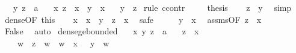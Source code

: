 \begin{isabellebody}
\ \ \ y\ z\ {\isacharcolon}{\kern0pt}{\isacharcolon}{\kern0pt}\ {\isacharprime}{\kern0pt}a\isanewline
\ \ \ {\isachardoublequoteopen}{\isasymAnd}x{\isachardot}{\kern0pt}\ z\ {\isacharless}{\kern0pt}\ x\ {\isasymLongrightarrow}\ y\ {\isasymle}\ x{\isachardoublequoteclose}\isanewline
\ \ \ {\isachardoublequoteopen}y\ {\isasymle}\ z{\isachardoublequoteclose}\isanewline
%
\isadelimproof
%
\endisadelimproof
%
\isatagproof
{}\isamarkupfalse%
\ {\isacharparenleft}{\kern0pt}rule\ ccontr{\isacharparenright}{\kern0pt}\isanewline
\ \ \isamarkupfalse%
\ {\isachardoublequoteopen}{\isasymnot}\ {\isacharquery}{\kern0pt}thesis{\isachardoublequoteclose}\isanewline
\ \ \isamarkupfalse%
\ {\isachardoublequoteopen}z\ {\isacharless}{\kern0pt}\ y{\isachardoublequoteclose}\ \isamarkupfalse%
\ simp\isanewline
\ \ \isamarkupfalse%
\ dense{\isacharbrackleft}{\kern0pt}OF\ this{\isacharbrackright}{\kern0pt}\isanewline
\ \ \isamarkupfalse%
\ x\ \ {\isachardoublequoteopen}x\ {\isacharless}{\kern0pt}\ y{\isachardoublequoteclose}\ \ {\isachardoublequoteopen}z\ {\isacharless}{\kern0pt}\ x{\isachardoublequoteclose}\ \isamarkupfalse%
\ safe\isanewline
\ \ \isamarkupfalse%
\ \isamarkupfalse%
\ {\isachardoublequoteopen}y\ {\isasymle}\ x{\isachardoublequoteclose}\ \isamarkupfalse%
\ assms{\isacharbrackleft}{\kern0pt}OF\ {\isacartoucheopen}z\ {\isacharless}{\kern0pt}\ x{\isacartoucheclose}{\isacharbrackright}{\kern0pt}\ \isacommand{{\isachardot}{\kern0pt}}\isamarkupfalse%
\isanewline
\ \ \isamarkupfalse%
\ \isamarkupfalse%
\ False\ \isamarkupfalse%
\ auto\isanewline
{}\isamarkupfalse%
%
\endisatagproof
{\isafoldproof}%
%
\isadelimproof
\isanewline
%
\endisadelimproof
\isanewline
{}\isamarkupfalse%
\ dense{\isacharunderscore}{\kern0pt}ge{\isacharunderscore}{\kern0pt}bounded{\isacharcolon}{\kern0pt}\isanewline
\ \ \ x\ y\ z\ {\isacharcolon}{\kern0pt}{\isacharcolon}{\kern0pt}\ {\isacharprime}{\kern0pt}a\isanewline
\ \ \ {\isachardoublequoteopen}z\ {\isacharless}{\kern0pt}\ x{\isachardoublequoteclose}\isanewline
\ \ \ {\isacharasterisk}{\kern0pt}{\isacharcolon}{\kern0pt}\ {\isachardoublequoteopen}{\isasymAnd}w{\isachardot}{\kern0pt}\ {\isasymlbrakk}\ z\ {\isacharless}{\kern0pt}\ w\ {\isacharsemicolon}{\kern0pt}\ w\ {\isacharless}{\kern0pt}\ x\ {\isasymrbrakk}\ {\isasymLongrightarrow}\ y\ {\isasymle}\ w{\isachardoublequoteclose}\isanewline

\end{isabellebody}

